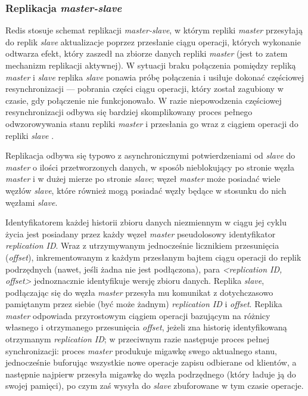 \subsubsection*{Replikacja \textit{master-slave}} \label{redisrepl}

Redis stosuje schemat replikacji \textit{master-slave}, w którym repliki \textit{master} przesyłają do replik \textit{slave} aktualizacje poprzez przesłanie ciągu operacji, których wykonanie odtwarza efekt, który zaszedł na zbiorze danych repliki \textit{master} (jest to zatem mechanizm replikacji aktywnej).  W sytuacji braku połączenia pomiędzy repliką \textit{master} i \textit{slave} replika \textit{slave} ponawia próbę połączenia i usiłuje dokonać częściowej resynchronizacji --- pobrania części ciągu operacji, który został zagubiony w czasie, gdy połączenie nie funkcjonowało. W razie niepowodzenia częściowej resynchronizacji odbywa się bardziej skomplikowany proces pełnego odwzorowywania stanu repliki \textit{master} i przesłania go wraz z ciągiem operacji do repliki \textit{slave} \cite{redisrepl}.

Replikacja odbywa się typowo z asynchronicznymi potwierdzeniami od \textit{slave} do \textit{master} o ilości przetworzonych danych, w sposób nieblokujący po stronie węzła \textit{master} i w dużej mierze po stronie \textit{slave}; węzeł \textit{master} może posiadać wiele węzłów \textit{slave}, które również mogą posiadać węzły będące w stosunku do nich węzłami \textit{slave}.

Identyfikatorem każdej historii zbioru danych niezmiennym w ciągu jej cyklu życia jest posiadany przez każdy węzeł \textit{master} pseudolosowy identyfikator \textit{replication ID}. Wraz z utrzymywanym jednocześnie licznikiem przesunięcia (\textit{offset}), inkrementowanym z każdym przesłanym bajtem ciągu operacji do replik podrzędnych (nawet, jeśli żadna nie jest podłączona), para \textit{<replication ID, offset>} jednoznacznie identyfikuje wersję zbioru danych. Replika \textit{slave}, podłączając się do węzła \textit{master} przesyła mu komunikat z dotychczasowo pamiętanym przez siebie (być może żadnym) \textit{replication ID} i \textit{offset}. Replika \textit{master} odpowiada przyrostowym ciągiem operacji bazującym na różnicy własnego i otrzymanego przesunięcia \textit{offset}, jeżeli zna historię identyfikowaną otrzymanym \textit{replication ID}; w przeciwnym razie następuje proces pełnej synchronizacji: proces \textit{master} produkuje migawkę swego aktualnego stanu, jednocześnie buforując wszystkie nowe operacje zapisu odbierane od klientów, a następnie najpierw przesyła migawkę do węzła podrzędnego (który ładuje ją do swojej pamięci), po czym zaś wysyła do \textit{slave} zbuforowane w tym czasie operacje.

